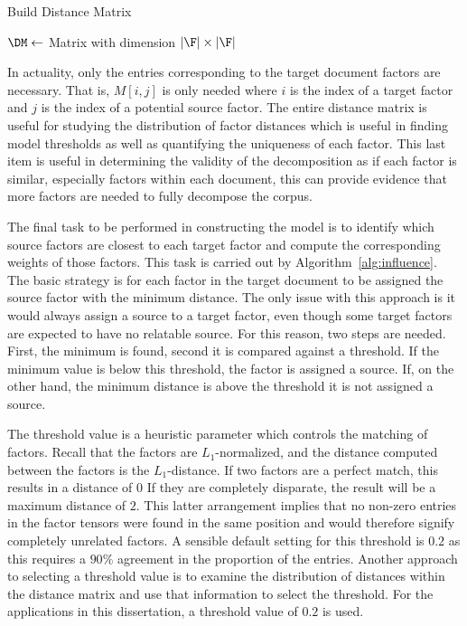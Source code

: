 \documentclass[../ut-dissertation.tex]{subfiles}
\begin{document}
\begin{algorithm}[p]
  \caption{Build Distance Matrix}
  \label{alg:distance}
   
  \Input{\F}
  \Output{\DM}
  \BlankLine
  $\DM \leftarrow $ Matrix with dimension $|\F| \times |\F|$\;
  \Return{\DM}
\end{algorithm}

In actuality, only the entries corresponding to the target document
factors are necessary.  That is, $M[i,j]$ is only needed where $i$ is
the index of a target factor and $j$ is the index of a potential
source factor.  The entire distance matrix is useful for studying the
distribution of factor distances which is useful in finding model
thresholds as well as quantifying the uniqueness of each factor. This
last item is useful in determining the validity of the decomposition
as if each factor is similar, especially factors within each document,
this can provide evidence that more factors are needed to fully
decompose the corpus.

The final task to be performed in constructing the model is to
identify which source factors are closest to each target factor and
compute the corresponding weights of those factors.  This task is
carried out by Algorithm~\ref{alg:influence}.  The basic strategy is
for each factor in the target document to be assigned the source
factor with the minimum distance.  The only issue with this approach
is it would always assign a source to a target factor, even though
some target factors are expected to have no relatable source.  For
this reason, two steps are needed.  First, the minimum is found,
second it is compared against a threshold.  If the minimum value is
below this threshold, the factor is assigned a source.  If, on the
other hand, the minimum distance is above the threshold it is not
assigned a source.

The threshold value is a heuristic parameter which controls the
matching of factors. Recall that the factors are $L_1$-normalized, and
the distance computed between the factors is the $L_1$-distance. If
two factors are a perfect match, this results in a distance of $0$
If they are completely disparate, the result will be a maximum
distance of $2$.  This latter arrangement implies that no non-zero
entries in the factor tensors were found in the same position and
would therefore signify completely unrelated factors.  A sensible
default setting for this threshold is $0.2$ as this requires a $90\%$
agreement in the proportion of the entries.  Another approach to
selecting a threshold value is to examine the distribution of
distances within the distance matrix and use that information to
select the threshold.  For the applications in this dissertation, a
threshold value of $0.2$ is used.
\end{document}
